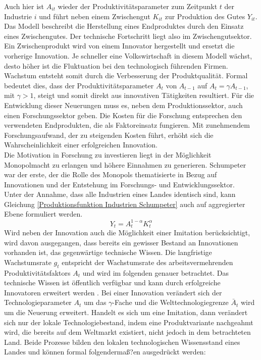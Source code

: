 Auch hier ist $A_{it}$ wieder der Produktivitätsparameter zum Zeitpunkt $t$ der Industrie $i$ und führt neben einem Zwischengut $K_{it}$ zur Produktion des Gutes $Y_{it}$. Das Modell beschreibt die Herstellung eines Endproduktes durch den Einsatz eines Zwischengutes. Der technische Fortschritt liegt also im Zwischengutsektor.  Ein Zwischenprodukt wird von einem Innovator hergestellt und ersetzt die vorherige Innovation. Je schneller eine Volkswirtschaft in diesem Modell wächst, desto höher ist die Fluktuation bei den technologisch führenden Firmen. \\ Wachstum entsteht somit durch die Verbesserung der Produktqualität. Formal bedeutet dies, dass der Produktivitätsparameter $A_t$ von $A_{t-1}$ auf $A_t=\gamma A_{t-1}$, mit $\gamma>1$, steigt und somit direkt aus innovativen Tätigkeiten resultiert. Für die Entwicklung dieser Neuerungen muss es, neben dem Produktionssektor, auch einen Forschungssektor geben. Die Kosten für die Forschung entsprechen den verwendeten Endprodukten, die als  Faktoreinsatz fungieren. Mit zunehmendem Forschungsaufwand, der zu steigenden Kosten führt, erhöht sich die Wahrscheinlichkeit einer erfolgreichen Innovation. \\
%
Die Motivation in Forschung zu investieren liegt in der Möglichkeit Monopolmacht zu erlangen und höhere Einnahmen zu generieren. Schumpeter war der erste, der die Rolle des Monopols thematisierte in Bezug auf Innovationen und der Entstehung im Forschungs- und Entwicklungssektor. \\ Unter der Annahme, dass alle Industrien eines Landes identisch sind, kann Gleichung \eqref{Produktionsfunktion Industrien Schumpeter} auch auf aggregierter Ebene formuliert werden.
%
	\begin{equation}
		Y_t=A_t^{1-\alpha}K_t^\alpha
	\end{equation}
%
Wird neben der Innovation auch die Möglichkeit einer Imitation berücksichtigt, wird davon ausgegangen, dass bereits ein gewisser Bestand an Innovationen vorhanden ist, das gegenwärtige technische Wissen. Die langfristige Wachstumsrate $g_t$ entspricht der Wachstumsrate des arbeitsvermehrenden Produktivitätsfaktors $A_t$ und wird im folgenden genauer betrachtet. Das technische Wissen ist öffentlich verfügbar und kann durch erfolgreiche Innovatoren erweitert werden \cite{Aghion.1992,Aghion.1998}.  Bei einer Innovation verändert sich der Technologieparameter $A_t$ um das $\gamma$-Fache und die Welttechnologiegrenze $\bar{A}_t$ wird um die Neuerung erweitert. Handelt es sich um eine Imitation, dann verändert sich nur der lokale Technologiebestand, indem eine Produktvariante nachgeahmt wird, die bereits auf dem Weltmarkt existiert, nicht jedoch in dem betrachteten Land. Beide Prozesse bilden den lokalen technologischen Wissensstand eines Landes und können formal folgendermaß?en ausgedrückt werden: 
